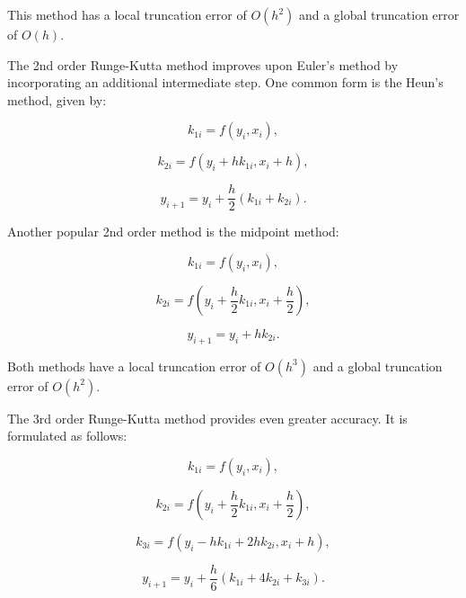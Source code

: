 \documentclass[12pt,a4paper]{report}
\begin{document}
This method has a local truncation error of \( O(h^2) \) and a global truncation error of \( O(h) \).

The 2nd order Runge-Kutta method improves upon Euler's method by incorporating an additional intermediate step. One common form is the Heun's method, given by:

\begin{equation}
  k_{1i} = f(y_i, x_i),
\end{equation}

\begin{equation}
  k_{2i} = f(y_i + h k_{1i}, x_i + h),
\end{equation}

\begin{equation}
  y_{i+1} = y_i + \frac{h}{2} (k_{1i} + k_{2i}).
\end{equation}

Another popular 2nd order method is the midpoint method:

\begin{equation}
  k_{1i} = f(y_i, x_i),
\end{equation}

\begin{equation}
  k_{2i} = f(y_i + \frac{h}{2} k_{1i}, x_i + \frac{h}{2}),
\end{equation}

\begin{equation}
  y_{i+1} = y_i + h k_{2i}.
\end{equation}

Both methods have a local truncation error of \( O(h^3) \) and a global truncation error of \( O(h^2) \).

The 3rd order Runge-Kutta method provides even greater accuracy. It is formulated as follows:

\begin{equation}
  k_{1i} = f(y_i, x_i),
\end{equation}

\begin{equation}
  k_{2i} = f\left(y_i + \frac{h}{2} k_{1i}, x_i + \frac{h}{2}\right),
\end{equation}

\begin{equation}
  k_{3i} = f\left(y_i - h k_{1i} + 2h k_{2i}, x_i + h\right),
\end{equation}

\begin{equation}
  y_{i+1} = y_i + \frac{h}{6} (k_{1i} + 4k_{2i} + k_{3i}).
\end{equation}
\end{document}

